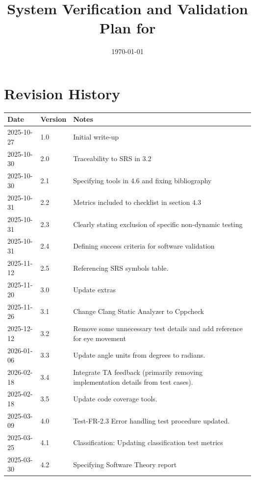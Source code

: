 \documentclass[12pt, titlepage]{article}
\begin{document}
\title{System Verification and Validation Plan for \progname{}} 
\author{\authname}
\date{\today}
	
\maketitle


\section*{Revision History}

\begin{tabularx}{\textwidth}{|p{3cm}|p{2cm}|X|}
\hline
{\bf Date} & {\bf Version} & {\bf Notes}\\
\hline
2025-10-27 & 1.0 & Initial write-up\\
2025-10-30 & 2.0 & Traceability to SRS in 3.2 \\
2025-10-30 & 2.1 & Specifying tools in 4.6 and fixing bibliography \\
2025-10-31 & 2.2 & Metrics included to checklist in section 4.3 \\
2025-10-31 & 2.3 & Clearly stating exclusion of specific non-dynamic testing \\
2025-10-31 & 2.4 & Defining success criteria for software validation \\
2025-11-12 & 2.5 & Referencing SRS symbols table. \\
2025-11-20 & 3.0 & Update extras \\
2025-11-26 & 3.1 & Change Clang Static Analyzer to Cppcheck \\
2025-12-12 & 3.2 & Remove some unnecessary test details and add reference for 
eye movement\\
2026-01-06 & 3.3 & Update angle units from degrees to radians. \\
2026-02-18 & 3.4 & Integrate TA feedback (primarily removing implementation 
details from test cases). \\
2025-02-18 & 3.5 & Update code coverage tools. \\
2025-03-09 & 4.0 & Test-FR-2.3 Error handling test procedure updated. \\
2025-03-25 & 4.1 & Classification: Updating classification test metrics \\
2025-03-30 & 4.2 & Specifying Software Theory report \\
\hline
\end{tabularx}
\end{document}
